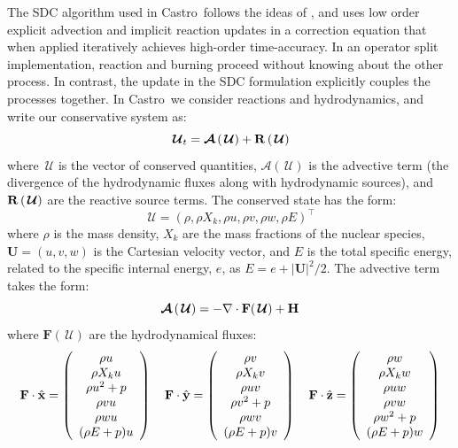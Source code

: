 \documentclass[a4paper]{jpconf}
\newcommand{\castro}{{\sffamily Castro}}
\newcommand{\Uc}{{\,\bm{\mathcal{U}}}}
\newcommand{\Advs}[1]{\boldsymbol{\mathcal{A}} \left(#1\right)}
\newcommand{\Ub}{\mathbf{U}}
\newcommand{\Fb}{\mathbf{F}}
\newcommand{\Rbs}[1]{{\bf R} \left ( #1 \right )}
\begin{document}
The SDC algorithm used in \castro\ follows the ideas of
\cite{dutt:2000,minion:2003}, and uses low order explicit advection
and implicit reaction updates in a correction equation that when
applied iteratively achieves high-order time-accuracy.  In an operator
split implementation, reaction and burning proceed without knowing
about the other process.  In contrast, the update in the SDC
formulation explicitly couples the processes together.  In \castro\ we
consider reactions and hydrodynamics, and write our conservative
system as:
\begin{equation}
\Uc_t = \Advs{\Uc} + \Rbs{\Uc}
\end{equation}
where $\Uc$ is the vector of conserved quantities, $\Advs{\Uc}$ is the
advective term (the divergence of the hydrodynamic fluxes along with
hydrodynamic sources), and $\Rbs{\Uc}$ are the reactive source terms.
The conserved state has the form:
\begin{equation}
\Uc = (\rho, \rho X_k, \rho u, \rho v, \rho w, \rho E)^\intercal
\end{equation}
where $\rho$ is the mass density, $X_k$ are the mass fractions of the
nuclear species, $\Ub = (u, v, w)$ is the Cartesian velocity vector,
and $E$ is the total specific energy, related to the specific internal
energy, $e$, as $E = e + |\Ub|^2/2$.  The advective term takes the form:
\begin{equation}
\Advs{\Uc} = -\nabla \cdot \Fb (\Uc) + {\bf H}
\end{equation}
where $\Fb(\Uc)$ are the hydrodynamical fluxes:
\begin{equation}
\Fb \cdot \hat{\bf x} = \left (\begin{array}{c} \rho u \\ \rho X_k u \\ \rho u^2 + p \\ \rho v u \\ \rho w u \\ (\rho E + p) u  \end{array} \right )
\quad
\Fb \cdot \hat{\bf y} = \left (\begin{array}{c} \rho v \\ \rho X_k v \\ \rho u v \\ \rho v^2 + p \\ \rho w v \\ (\rho E + p) v  \end{array} \right )
\quad
\Fb \cdot \hat{\bf z} = \left (\begin{array}{c} \rho w \\ \rho X_k w \\ \rho u w \\ \rho v w \\ \rho w^2 + p \\ (\rho E + p) w  \end{array} \right )
\end{equation}
\end{document}
